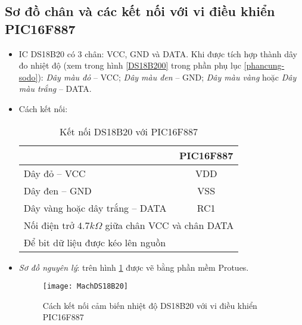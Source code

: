 \subsection{Sơ đồ chân và các kết nối với vi điều khiển PIC16F887}
\begin{itemize}
\item IC DS18B20 có 3 chân: VCC, GND và DATA. Khi được tích hợp thành dây đo nhiệt độ (xem trong hình \ref{DS18B200} trong phần phụ lục \ref{phancung-sodo}): \textit{Dây màu đỏ} -- VCC; \textit{Dây màu đen} -- GND; \textit{Dây màu vàng} hoặc \textit{Dây màu trắng} -- DATA.
\item Cách kết nối:
\begin{table}[h]
\begin{center}
\begin{tabular}{|p{7cm}|c|}\hline
\centering{\textbf{DS18B20}} & \textbf{PIC16F887} \\ \hline
Dây đỏ -- VCC & VDD \\ \hline
Dây đen -- GND & VSS \\ \hline
Dây vàng hoặc dây trắng -- DATA & RC1 \\ \hline
\multicolumn{2}{|c|}{Nối điện trở $4.7k\Omega$ giữa chân VCC và chân DATA}\\ 
\multicolumn{2}{|l|}{Để bit dữ liệu được kéo lên nguồn}\\ \hline
\end{tabular}
\end{center}
\caption{Kết nối DS18B20 với PIC16F887}
\end{table}
\item \textit{Sơ đồ nguyên lý}: trên hình \ref{Fig:ket-noi-DS18B20-PIC} được vẽ bằng phần mềm Protues.
\begin{figure}[!h]
\begin{center}
\texttt{[image: MachDS18B20]}
\end{center}
\caption{Cách kết nối cảm biến nhiệt độ DS18B20 với vi điều khiển PIC16F887}\label{Fig:ket-noi-DS18B20-PIC}
\end{figure}
\end{itemize}
